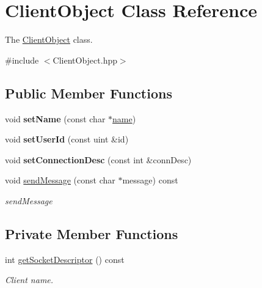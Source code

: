 \hypertarget{classClientObject}{}\section{Client\+Object Class Reference}
\label{classClientObject}


The \hyperlink{classClientObject}{Client\+Object} class.  




{\ttfamily \#include $<$Client\+Object.\+hpp$>$}

\subsection*{Public Member Functions}
\begin{DoxyCompactItemize}
\item 
\mbox{\label{classClientObject_ab91f5a41ec123f2d312c7162eda4dff4}} 
void {\bfseries set\+Name} (const char $\ast$\hyperlink{classClientObject_ae5cc4e5bbbb99cdbe152273daa15633a}{name})
\item 
\mbox{\label{classClientObject_a91713ffa31ed38978f10139dc2ddb81f}} 
void {\bfseries set\+User\+Id} (const uint \&id)
\item 
\mbox{\label{classClientObject_a6cc23f4c8d93b2945399a7c5c0af7501}} 
void {\bfseries set\+Connection\+Desc} (const int \&conn\+Desc)
\item 
void \hyperlink{classClientObject_a4704430f61bd85efd980c6ea083d5374}{send\+Message} (const char $\ast$message) const
\begin{DoxyCompactList}\small\item\em send\+Message \end{DoxyCompactList}\end{DoxyCompactItemize}
\subsection*{Private Member Functions}
\begin{DoxyCompactItemize}
\item 
\mbox{\label{classClientObject_a32f1b03ba465cda2796f48a46ef356df}} 
int \hyperlink{classClientObject_a32f1b03ba465cda2796f48a46ef356df}{get\+Socket\+Descriptor} () const
\begin{DoxyCompactList}\small\item\em Client name. \end{DoxyCompactList}\end{DoxyCompactItemize}
